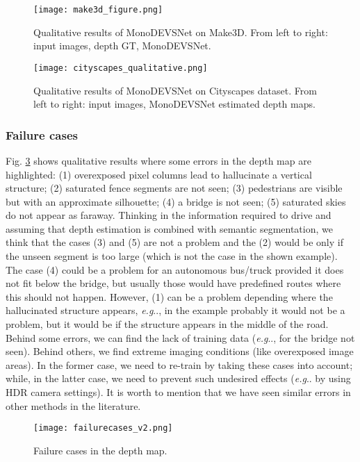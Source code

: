 \documentclass[journal]{IEEEtran}
\makeatletter
\DeclareRobustCommand\onedot{\futurelet\@let@token\@onedot}
\def\@onedot{\ifx\@let@token.\else.\null\fi\xspace}
\def\eg{\emph{e.g}\onedot} \def\Eg{\emph{E.g}\onedot}
\newcommand{\Fig}[1]{Fig. \ref{fig:#1}}
\makeatother
\begin{document}
\begin{figure}
    \centering
    \texttt{[image: make3d\_figure.png]}
    \caption{Qualitative results of MonoDEVSNet on Make3D. From left to right: input images, depth GT, MonoDEVSNet. }
    \label{fig:make3d_qualitative}
\end{figure}

\begin{figure}
    \centering
    \texttt{[image: cityscapes\_qualitative.png]}
    \caption{Qualitative results of MonoDEVSNet on Cityscapes dataset. From left to right: input images, MonoDEVSNet estimated depth maps.}
    \label{fig:cityscapes_qualitative}
\end{figure}

\subsubsection{Failure cases} \Fig{failurecases} shows qualitative results where some errors in the depth map are highlighted: (1) overexposed pixel columns lead to hallucinate a vertical structure; (2) saturated fence segments are not seen; (3) pedestrians are visible but with an approximate silhouette; (4) a bridge is not seen; (5) saturated skies do not appear as faraway. Thinking in the information required to drive and assuming that depth estimation is combined with semantic segmentation, we think that the cases (3) and (5) are not a problem and the (2) would be only if the unseen segment is too large (which is not the case in the shown example). The case (4) could be a problem for an autonomous bus/truck provided it does not fit below the bridge, but usually those would have predefined routes where this should not happen. However, (1) can be a problem depending where the hallucinated structure appears, {\eg}, in the example probably it would not be a problem, but it would be if the structure appears in the middle of the road. Behind some errors, we can find the lack of training data ({\eg}, for the bridge not seen). Behind others, we find extreme imaging conditions (like overexposed image areas). In the former case, we need to re-train by taking these cases into account; while, in the latter case, we need to prevent such undesired effects ({\eg} by using HDR camera settings). It is worth to mention that we have seen similar errors in other methods in the literature.

\begin{figure}
    \centering
    \texttt{[image: failurecases\_v2.png]}
    \caption{Failure cases in the depth map.}
    \label{fig:failurecases}
\end{figure}
\end{document}
